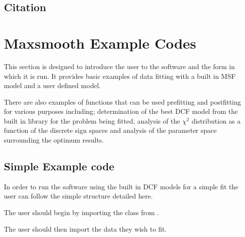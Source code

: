 \documentclass[letterpaper,10pt,english]{sphinxmanual}
\begin{document}
\section{Citation}
\label{\detokenize{source/intro:citation}}

\chapter{Maxsmooth Example Codes}
\label{\detokenize{source/maxsmooth:maxsmooth-example-codes}}\label{\detokenize{source/maxsmooth::doc}}
This section is designed to introduce the user to the software and the form
in which it is run. It provides basic examples of data fitting with a built in
MSF model and a user defined model.

There are also examples of functions that can be used pre\sphinxhyphen{}fitting and post\sphinxhyphen{}fitting
for various purposes including; determination of the best DCF model from the
built in library for the problem being fitted, analysis of the \({\chi^2}\)
distribution as a function of the discrete sign spaces and analysis of the
parameter space surrounding the optimum results.


\section{Simple Example code}
\label{\detokenize{source/maxsmooth:simple-example-code}}
In order to run the  software using the built
in DCF models for a simple fit the user can follow the simple structure detailed here.

The user should begin by importing the  class from .

\begin{sphinxVerbatim}[commandchars=\\\{\}]
   
\end{sphinxVerbatim}

The user should then import the data they wish to fit.

\begin{sphinxVerbatim}[commandchars=\\\{\}]
   

  
  
\end{sphinxVerbatim}
\end{document}
